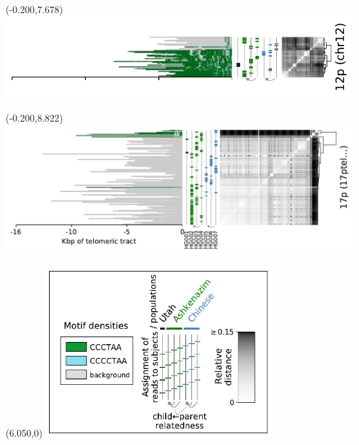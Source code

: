 \documentclass{article}
\begin{document}
\begin{textblock}{13}(-0.200,7.678)\includegraphics{Figure_4/chr12.pdf}\end{textblock}
\begin{textblock}{13}(-0.200,8.822)\includegraphics{Figure_4/17ptel_1_500K_1_12_12.pdf}\end{textblock}
\begin{textblock}{13}(6.050,0)
\includegraphics[width=3.400in,keepaspectratio]{Figure_4/legend.pdf}
\end{textblock}
\end{document}
